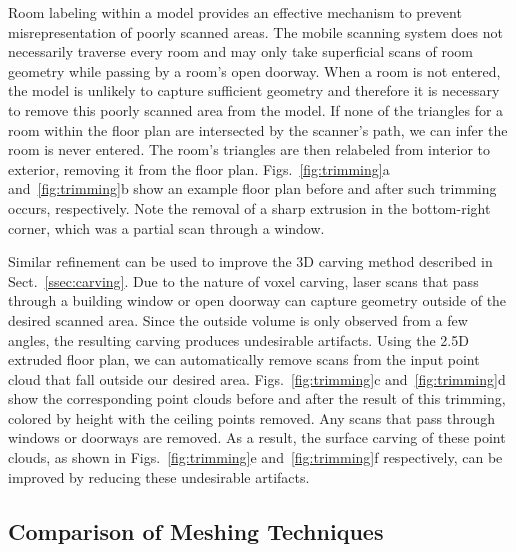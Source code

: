 \documentclass[journal]{IEEEtran}
\begin{document}
Room labeling within a model provides an effective mechanism to prevent misrepresentation of poorly scanned areas.  The mobile scanning system does not necessarily traverse every room and may only take superficial scans of room geometry while passing by a room's open doorway.  When a room is not entered, the model is unlikely to capture sufficient geometry and therefore it is necessary to remove this poorly scanned area from the model.  If none of the triangles for a room within the floor plan are intersected by the scanner's path, we can infer the room is never entered.  The room's triangles are then relabeled from interior to exterior, removing it from the floor plan.  Figs.~\ref{fig:trimming}a and~\ref{fig:trimming}b show an example floor plan before and after such trimming occurs, respectively.  Note the removal of a sharp extrusion in the bottom-right corner, which was a partial scan through a window.

Similar refinement can be used to improve the 3D carving method described in Sect.~\ref{ssec:carving}.  Due to the nature of voxel carving, laser scans that pass through a building window or open doorway can capture geometry outside of the desired scanned area.  Since the outside volume is only observed from a few angles, the resulting carving produces undesirable artifacts.  Using the 2.5D extruded floor plan, we can automatically remove scans from the input point cloud that fall outside our desired area.  Figs.~\ref{fig:trimming}c and~\ref{fig:trimming}d show the corresponding point clouds before and after the result of this trimming, colored by height with the ceiling points removed.  Any scans that pass through windows or doorways are removed.  As a result, the surface carving of these point clouds, as shown in Figs.~\ref{fig:trimming}e and~\ref{fig:trimming}f respectively, can be improved by reducing these undesirable artifacts.

\subsection{Comparison of Meshing Techniques}
\label{ssec:comparison}

\end{document}
